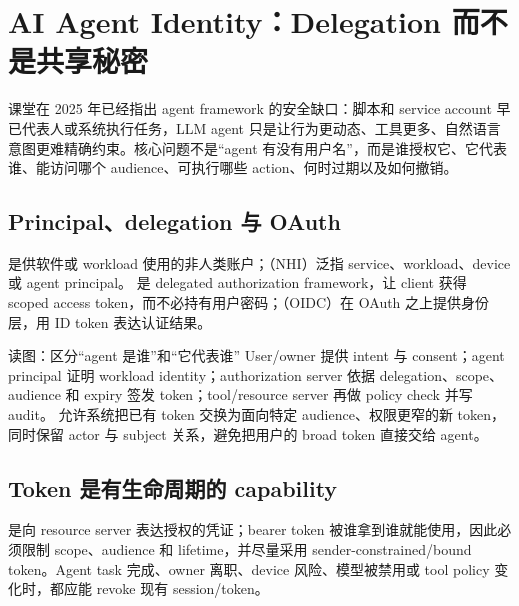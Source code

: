 \section{AI Agent Identity：Delegation 而不是共享秘密}

课堂在 2025 年已经指出 agent framework 的安全缺口：脚本和 service account 早已代表人或系统执行任务，LLM agent 只是让行为更动态、工具更多、自然语言意图更难精确约束。核心问题不是“agent 有没有用户名”，而是谁授权它、它代表谁、能访问哪个 audience、可执行哪些 action、何时过期以及如何撤销。

\subsection{Principal、delegation 与 OAuth}

 是供软件或 workload 使用的非人类账户；（NHI）泛指 service、workload、device 或 agent principal。 是 delegated authorization framework，让 client 获得 scoped access token，而不必持有用户密码；（OIDC）在 OAuth 之上提供身份层，用 ID token 表达认证结果。


\begin{knowledgebox}{读图：区分“agent 是谁”和“它代表谁”}
User/owner 提供 intent 与 consent；agent principal 证明 workload identity；authorization server 依据 delegation、scope、audience 和 expiry 签发 token；tool/resource server 再做 policy check 并写 audit。 允许系统把已有 token 交换为面向特定 audience、权限更窄的新 token，同时保留 actor 与 subject 关系，避免把用户的 broad token 直接交给 agent。
\end{knowledgebox}


\subsection{Token 是有生命周期的 capability}

 是向 resource server 表达授权的凭证；bearer token 被谁拿到谁就能使用，因此必须限制 scope、audience 和 lifetime，并尽量采用 sender-constrained/bound token。Agent task 完成、owner 离职、device 风险、模型被禁用或 tool policy 变化时，都应能 revoke 现有 session/token。

